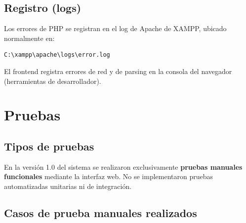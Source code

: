 \documentclass[10pt,letterpaper]{report}
\begin{document}
\section{Registro (logs)}

Los errores de PHP se registran en el log de Apache de XAMPP, ubicado normalmente en:
\begin{lstlisting}[style=bashstyle]
C:\xampp\apache\logs\error.log
\end{lstlisting}
El frontend registra errores de red y de parsing en la consola del navegador (herramientas de desarrollador).

\chapter{Pruebas}

\section{Tipos de pruebas}

En la versión 1.0 del sistema se realizaron exclusivamente \textbf{pruebas manuales funcionales} mediante la interfaz web. No se implementaron pruebas automatizadas unitarias ni de integración.

\section{Casos de prueba manuales realizados}
\end{document}

